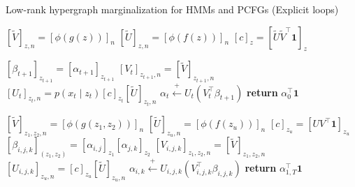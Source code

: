 \documentclass{article}
\begin{document}
\begin{algorithm}[H]
\caption{Low-rank hypergraph marginalization for HMMs and PCFGs (Explicit loops)}
\label{alg:lr-marg-hmm-pcfg2}
\begin{minipage}[t]{0.45\textwidth}
\begin{algorithmic}
        \STATE $[\tilde{V}]_{z,n} = [\phi(g(z))]_n$
        \STATE $[\tilde{U}]_{z,n} = [\phi(f(z))]_n$
    \ENDFOR
\ENDFOR
{}
    \STATE $[c]_z = [\tilde{U}\tilde{V}^\top\mathbf{1}]_z$
\ENDFOR

        \STATE $[\beta_{t+1}]_{z_{t+1}} = [\alpha_{t+1}]_{z_{t+1}}$
        \STATE $[V_t]_{z_{t+1},n} = [\tilde{V}]_{z_{t+1},n}$
    \ENDFOR
        \STATE $[U_t]_{z_t,n} = p(x_t \mid z_t)[c]_{z_{t}}[\tilde{U}]_{z_t,n}$
    \ENDFOR
    \STATE $\alpha_t \stackrel{+}{\gets} U_t(V_t^\top\beta_{t+1})$
\ENDFOR
\STATE \textbf{return} $\alpha_0^\top \mathbf{1}$
\end{algorithmic}
\end{minipage}
\vspace{0pt}
\begin{minipage}[t]{0.50\textwidth}
\begin{algorithmic} 
        \STATE $[\tilde{V}]_{z_1,z_2,n} = [\phi(g(z_1,z_2))]_n$
    \ENDFOR
        \STATE $[\tilde{U}]_{z_u,n} = [\phi(f(z_u))]_n$
    \ENDFOR
\ENDFOR
{}
    \STATE $[c]_{z_u} = [UV^\top\mathbf{1}]_{z_u}$
\ENDFOR
{}
        \STATE $[\beta_{i,j,k}]_{(z_1,z_2)} = [\alpha_{i,j}]_{z_1}[\alpha_{j,k}]_{z_2}$
        \STATE $[V_{i,j,k}]_{z_1,z_2,n} = [\tilde{V}]_{z_1,z_2,n}$
    \ENDFOR
        \STATE $[U_{i,j,k}]_{z_u,n} = [c]_{z_u}[\tilde{U}]_{z_u,n}$
    \ENDFOR
    \STATE $\alpha_{i,k} \stackrel{+}{\gets} U_{i,j,k}(V_{i,j,k}^\top\beta_{i,j,k})$
\ENDFOR
\STATE \textbf{return} $\alpha_{1,T}^\top \mathbf{1}$
\end{algorithmic}
\end{minipage}
\end{algorithm}
\end{document}
